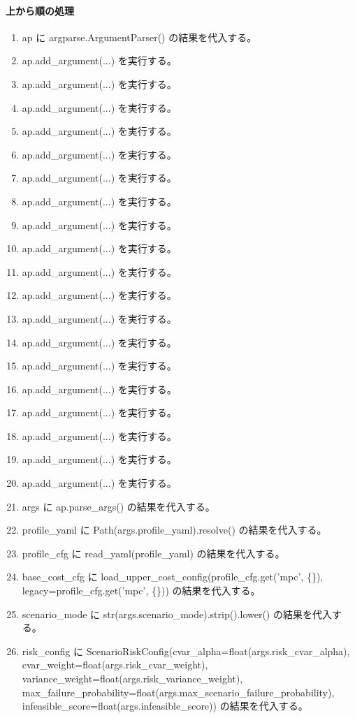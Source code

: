 \documentclass[a4paper,11pt]{article}
\begin{document}
            \paragraph{上から順の処理}
            \begin{enumerate}[leftmargin=1.8em]
            \item ap に argparse.ArgumentParser() の結果を代入する。
\item ap.add\_argument(...) を実行する。
\item ap.add\_argument(...) を実行する。
\item ap.add\_argument(...) を実行する。
\item ap.add\_argument(...) を実行する。
\item ap.add\_argument(...) を実行する。
\item ap.add\_argument(...) を実行する。
\item ap.add\_argument(...) を実行する。
\item ap.add\_argument(...) を実行する。
\item ap.add\_argument(...) を実行する。
\item ap.add\_argument(...) を実行する。
\item ap.add\_argument(...) を実行する。
\item ap.add\_argument(...) を実行する。
\item ap.add\_argument(...) を実行する。
\item ap.add\_argument(...) を実行する。
\item ap.add\_argument(...) を実行する。
\item ap.add\_argument(...) を実行する。
\item ap.add\_argument(...) を実行する。
\item ap.add\_argument(...) を実行する。
\item ap.add\_argument(...) を実行する。
\item args に ap.parse\_args() の結果を代入する。
\item profile\_yaml に Path(args.profile\_yaml).resolve() の結果を代入する。
\item profile\_cfg に read\_yaml(profile\_yaml) の結果を代入する。
\item base\_cost\_cfg に load\_upper\_cost\_config(profile\_cfg.get('mpc', \{\}), legacy=profile\_cfg.get('mpc', \{\})) の結果を代入する。
\item scenario\_mode に str(args.scenario\_mode).strip().lower() の結果を代入する。
\item risk\_config に ScenarioRiskConfig(cvar\_alpha=float(args.risk\_cvar\_alpha), cvar\_weight=float(args.risk\_cvar\_weight), variance\_weight=float(args.risk\_variance\_weight), max\_failure\_probability=float(args.max\_scenario\_failure\_probability), infeasible\_score=float(args.infeasible\_score)) の結果を代入する。

\end{enumerate}
\end{document}
